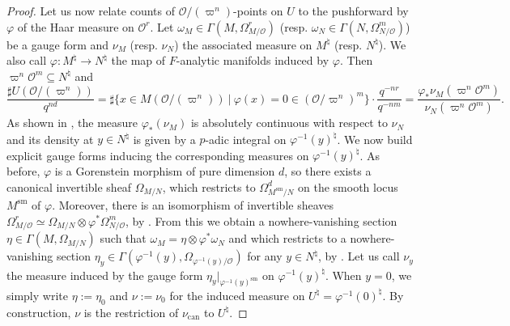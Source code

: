 \documentclass[11pt,english]{article}
\numberwithin{equation}{section}
\numberwithin{figure}{section}
\theoremstyle{definition}
\theoremstyle{plain}
\theoremstyle{remark}
\begin{document}
\begin{proof}
Let us now relate counts of $\mathcal{O}/(\varpi^{n})$-points on
$U$ to the pushforward by $\varphi$ of the Haar measure on $\mathcal{O}^{r}$.
Let $\omega_{M}\in\Gamma(M,\Omega_{M/\mathcal{O}}^{r})$ (resp. $\omega_{N}\in\Gamma(N,\Omega_{N/\mathcal{O}}^{m})$)
be a gauge form and $\nu_{M}$ (resp. $\nu_{N}$) the associated measure
on $M^{\natural}$ (resp. $N^{\natural}$). We also call $\varphi:M^{\natural}\rightarrow N^{\natural}$
the map of $F$-analytic manifolds induced by $\varphi$. Then $\varpi^{n}\mathcal{O}^{m}\subseteq N^{\natural}$
and\[
\frac{\sharp U(\mathcal{O}/(\varpi^n))}{q^{nd}}
=
\sharp\{x\in M(\mathcal{O}/(\varpi^n))\ \vert\ \varphi(x)=0\in(\mathcal{O}/\varpi^n)^m\}\cdot\frac{q^{-nr}}{q^{-nm}}
=
\frac{\varphi_*\nu_M(\varpi^n\mathcal{O}^m)}{\nu_N(\varpi^n\mathcal{O}^m)}.
\]As shown in \cite[\S 3.3.]{AA16}, the measure $\varphi_{*}(\nu_{M})$
is absolutely continuous with respect to $\nu_{N}$ and its density
at $y\in N^{\natural}$ is given by a $p$-adic integral on $\varphi^{-1}(y)^{\natural}$.
We now build explicit gauge forms inducing the corresponding measures
on $\varphi^{-1}(y)^{\natural}$. As before, $\varphi$ is a Gorenstein
morphism of pure dimension $d$, so there exists a canonical invertible
sheaf $\Omega_{M/N}$, which restricts to $\Omega_{M^{\mathrm{sm}}/N}^{d}$
on the smooth locus $M^{\mathrm{sm}}$ of $\varphi$. Moreover, there
is an isomorphism of invertible sheaves $\Omega_{M/\mathcal{O}}^{r}\simeq\Omega_{M/N}\otimes\varphi^{*}\Omega_{N/\mathcal{O}}^{m}$,
by \cite[Thm. 4.3.3.]{Con00}. From this we obtain a nowhere-vanishing
section $\eta\in\Gamma(M,\Omega_{M/N})$ such that $\omega_{M}=\eta\otimes\varphi^{*}\omega_{N}$
and which restricts to a nowhere-vanishing section $\eta_{y}\in\Gamma(\varphi^{-1}(y),\Omega_{\varphi^{-1}(y)/\mathcal{O}})$
for any $y\in N^{\natural}$, by \cite[Thm. 3.6.1.]{Con00}. Let us
call $\nu_{y}$ the measure induced by the gauge form $\eta_{y}\vert_{\varphi^{-1}(y)^{\mathrm{sm}}}$
on $\varphi^{-1}(y)^{\natural}$. When $y=0$, we simply write $\eta:=\eta_{0}$
and $\nu:=\nu_{0}$ for the induced measure on $U^{\natural}=\varphi^{-1}(0)^{\natural}$.
By construction, $\nu$ is the restriction of $\nu_{\mathrm{can}}$
to $U^{\natural}$.


\end{proof}
\end{document}
